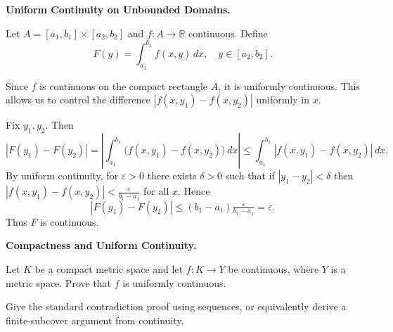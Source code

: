 \begin{problem}[CP-II-0299]
\label{prob:cp-ii-0299}
\textbf{Uniform Continuity on Unbounded Domains.}

\hspace*{1.5em}Let $A=[a_1,b_1]\times[a_2,b_2]$ and $f:A\to\mathbb{R}$ continuous. Define
\[
F(y)=\int_{a_1}^{b_1} f(x,y)\,dx, \quad y\in[a_2,b_2].
\]

Since $f$ is continuous on the compact rectangle $A$, it is uniformly continuous.
This allows us to control the difference $|f(x,y_1)-f(x,y_2)|$ uniformly in $x$.
\end{problem}

\begin{solution}
Fix $y_1,y_2$. Then
	\[
	|F(y_1)-F(y_2)|
	=\left|\int_{a_1}^{b_1}\big(f(x,y_1)-f(x,y_2)\big)\,dx\right|
	\leq \int_{a_1}^{b_1}|f(x,y_1)-f(x,y_2)|\,dx.
	\]
	By uniform continuity, for $\varepsilon>0$ there exists $\delta>0$ such that if $|y_1-y_2|<\delta$ then
	$|f(x,y_1)-f(x,y_2)|<\tfrac{\varepsilon}{b_1-a_1}$ for all $x$.
	Hence
	\[
	|F(y_1)-F(y_2)|\leq (b_1-a_1)\tfrac{\varepsilon}{b_1-a_1}=\varepsilon.
	\]
	Thus $F$ is continuous.
\end{solution}

\begin{problem}[CP-II-0300]
\label{prob:cp-ii-0300}
\textbf{Compactness and Uniform Continuity.}

\hspace*{1.5em}Let \(K\) be a compact metric space and let \(f:K\to Y\) be continuous, where
\(Y\) is a metric space. Prove that \(f\) is uniformly continuous.

Give the standard contradiction proof using sequences, or equivalently derive
a finite-subcover argument from continuity.
\end{problem}

